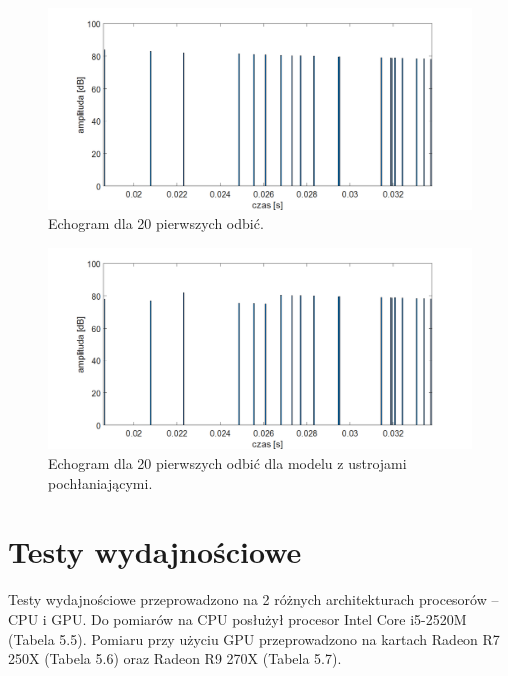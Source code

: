 \begin{figure}[h]
        \centering
                \centering
                \includegraphics[width=16cm]{echogramodbicia}
	\caption{Echogram dla 20 pierwszych odbić.}
\end{figure}

\begin{figure}[h]
        \centering
                \centering
                \includegraphics[width=16cm]{echogramodbiciazpoch}
	\caption{Echogram dla 20 pierwszych odbić dla modelu z ustrojami pochłaniającymi.}
\end{figure}


\section{Testy wydajnościowe}\label{sec:asdas2d}

Testy wydajnościowe przeprowadzono na 2 różnych architekturach procesorów – CPU i GPU. Do pomiarów na CPU posłużył procesor Intel Core i5-2520M (Tabela 5.5). Pomiaru przy użyciu GPU przeprowadzono na kartach Radeon R7 250X (Tabela 5.6) oraz Radeon R9 270X (Tabela 5.7).
 
